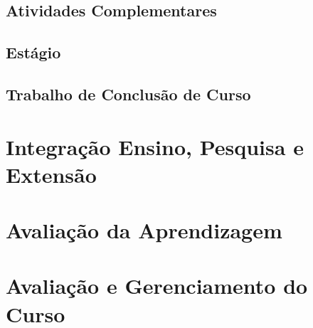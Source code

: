     
    
    
\section{Atividades Complementares}
\label{sec:atividadesComplementares}

    

\section{Estágio}

    
    
\section{Trabalho de Conclusão de Curso}

    

    
\chapter{Integração Ensino, Pesquisa e Extensão}\label{sec:integracao}

    


\chapter{Avaliação da Aprendizagem}\label{sec:avaliacao_aprendizagem}

    

\chapter{Avaliação e Gerenciamento do Curso}\label{sec:avaliacao_gerenciamento}

    








